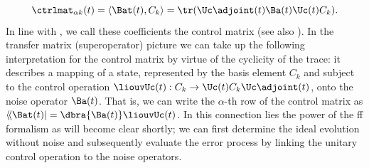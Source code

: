\begin{equation}\label{eq:control_matrix}
    \ctrlmat_{\alpha k}(t) = \langle\Bat(t), C_k\rangle  = \tr(\Uc\adjoint(t)\Ba(t)\Uc(t)C_k).
\end{equation}
In line with \citeauthor{Green2013}, we call these coefficients the control matrix (see also ). In the transfer matrix (superoperator) picture we can take up the following interpretation for the control matrix by virtue of the cyclicity of the trace: it describes a mapping of a state, represented by the basis element $C_k$ and subject to the control operation $\liouvUc(t): C_k\rightarrow\Uc(t) C_k\Uc\adjoint(t)$, onto the noise operator $\Ba(t)$. That is, we can write the $\alpha$-th row of the control matrix as $\langle\!\langle{\Bat(t)}\rvert = \dbra{\Ba(t)}\liouvUc(t)$. In this connection lies the power of the \gls{ff} formalism as will become clear shortly; we can first determine the ideal evolution without noise and subsequently evaluate the error process by linking the unitary control operation to the noise operators.

